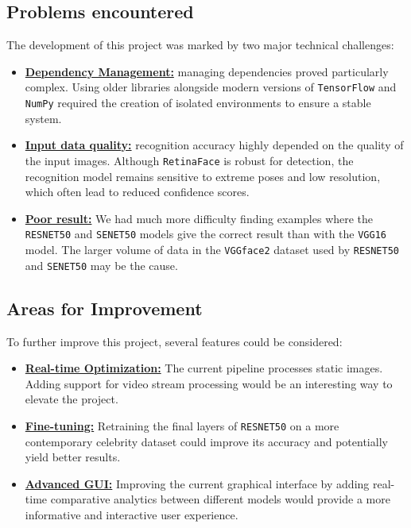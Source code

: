 \documentclass[a4paper,12pt]{article}
\begin{document}
\subsection{Problems encountered}
The development of this project was marked by two major technical challenges: 
\begin{itemize}
    \item \textbf{\underline{Dependency Management:}} managing dependencies proved particularly complex. Using older libraries alongside modern versions of \texttt{TensorFlow} and \texttt{NumPy} required the creation of isolated environments to ensure a stable system.
    \item \textbf{\underline{Input data quality:}} recognition accuracy highly depended on the quality of the input images. Although \texttt{RetinaFace} is robust for detection, the recognition model remains sensitive to extreme poses and low resolution, which often lead to reduced confidence scores.
    \item \textbf{\underline{Poor result:}} We had much more difficulty finding examples where the \texttt{RESNET50} and \texttt{SENET50} models give the correct result than with the \texttt{VGG16} model. The larger volume of data in the \texttt{VGGface2} dataset used by \texttt{RESNET50} and \texttt{SENET50} may be the cause.
\end{itemize}

\subsection{Areas for Improvement}
To further improve this project, several features could be considered:
\begin{itemize}
    \item \textbf{\underline{Real-time Optimization:}} The current pipeline processes static images. Adding support for video stream processing would be an interesting way to elevate the project.
    \item \textbf{\underline{Fine-tuning:}} Retraining the final layers of \texttt{RESNET50} on a more contemporary celebrity dataset could improve its accuracy and potentially yield better results.
    \item \textbf{\underline{Advanced GUI:}} Improving the current graphical interface by adding real-time comparative analytics between different models would provide a more informative and interactive user experience.
\end{itemize}
\end{document}

